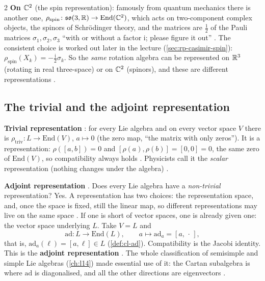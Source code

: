 \begin{paracol}{2}
\textbf{On $\mathbb{C}^2$} (the spin representation): famously from quantum mechanics there is another one, $\rho_{\mathrm{spin}}\colon\mathfrak{so}(3,\mathbb{R})\to\mathrm{End}(\mathbb{C}^2)$, which acts on two-component complex objects, the spinors of Schr\"odinger theory, and the matrices are $\frac12$ of the Pauli matrices $\sigma_1,\sigma_2,\sigma_3$ ``with or without a factor $\mathrm{i}$; please figure it out''   . The consistent choice is worked out later in the lecture (\cref{sec:rp-casimir-spin}): $\rho_{\mathrm{spin}}(X_k)=-\frac{\mathrm i}{2}\sigma_k$. So the \emph{same} rotation algebra can be represented on $\mathbb{R}^3$ (rotating in real three-space) or on $\mathbb{C}^2$ (spinors), and these are different representations  .

\subsection{The trivial and the adjoint representation}\label{sec:rp-triv}
\textbf{Trivial representation}  : for every Lie algebra and on every vector space $V$ there is $\rho_{\mathrm{triv}}\colon L\to\mathrm{End}(V)$, $a\mapsto0$ (the zero map, ``the matrix with only zeros''). It is a representation: $\rho([a,b])=0$ and $[\rho(a),\rho(b)]=[0,0]=0$, the same zero of $\mathrm{End}(V)$, so compatibility always holds  . Physicists call it the \emph{scalar} representation (nothing changes under the algebra) .

\textbf{Adjoint representation} . Does every Lie algebra have a \emph{non-trivial} representation? Yes. A representation has two choices: the representation space, and, once the space is fixed, still the linear map, so different representations may live on the same space   . If one is short of vector spaces, one is already given one: the vector space underlying $L$. Take $V=L$ and
\[
  \mathrm{ad}\colon L\to\mathrm{End}(L),\qquad a\mapsto\mathrm{ad}_a=[a,\,\cdot\,],
\]
that is, $\mathrm{ad}_a(\ell)=[a,\ell]\in L$ (\cref{def:cl-ad}). Compatibility is the Jacobi identity. This is the \textbf{adjoint representation}    . The whole classification of semisimple and simple Lie algebras (\cref{ch:l14}) made essential use of it: the Cartan subalgebra is where $\mathrm{ad}$ is diagonalised, and all the other directions are eigenvectors .


\end{paracol}
